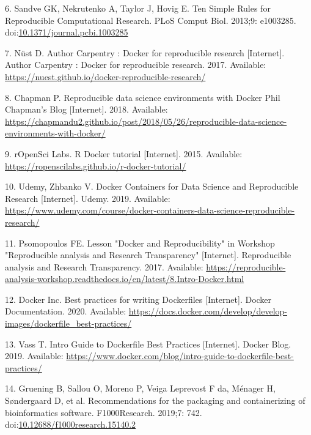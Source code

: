 \documentclass[10pt,letterpaper]{article}
\begin{document}
\leavevmode\hypertarget{ref-sandve_ten_2013}{}%
6. Sandve GK, Nekrutenko A, Taylor J, Hovig E. Ten Simple Rules for
Reproducible Computational Research. PLoS Comput Biol. 2013;9: e1003285.
doi:\href{https://doi.org/10.1371/journal.pcbi.1003285}{10.1371/journal.pcbi.1003285}

\leavevmode\hypertarget{ref-nust_author_2017}{}%
7. Nüst D. Author Carpentry : Docker for reproducible research
{[}Internet{]}. Author Carpentry : Docker for reproducible research.
2017. Available:
\url{https://nuest.github.io/docker-reproducible-research/}

\leavevmode\hypertarget{ref-chapman_reproducible_2018}{}%
8. Chapman P. Reproducible data science environments with Docker Phil
Chapman's Blog {[}Internet{]}. 2018. Available:
\url{https://chapmandu2.github.io/post/2018/05/26/reproducible-data-science-environments-with-docker/}

\leavevmode\hypertarget{ref-ropensci_labs_r_2015}{}%
9. rOpenSci Labs. R Docker tutorial {[}Internet{]}. 2015. Available:
\url{https://ropenscilabs.github.io/r-docker-tutorial/}

\leavevmode\hypertarget{ref-udemy_docker_2019}{}%
10. Udemy, Zhbanko V. Docker Containers for Data Science and
Reproducible Research {[}Internet{]}. Udemy. 2019. Available:
\url{https://www.udemy.com/course/docker-containers-data-science-reproducible-research/}

\leavevmode\hypertarget{ref-psomopoulos_lesson_2017}{}%
11. Psomopoulos FE. Lesson "Docker and Reproducibility" in Workshop
"Reproducible analysis and Research Transparency" {[}Internet{]}.
Reproducible analysis and Research Transparency. 2017. Available:
\url{https://reproducible-analysis-workshop.readthedocs.io/en/latest/8.Intro-Docker.html}

\leavevmode\hypertarget{ref-docker_inc_best_2020}{}%
12. Docker Inc. Best practices for writing Dockerfiles {[}Internet{]}.
Docker Documentation. 2020. Available:
\url{https://docs.docker.com/develop/develop-images/dockerfile_best-practices/}

\leavevmode\hypertarget{ref-vass_intro_2019}{}%
13. Vass T. Intro Guide to Dockerfile Best Practices {[}Internet{]}.
Docker Blog. 2019. Available:
\url{https://www.docker.com/blog/intro-guide-to-dockerfile-best-practices/}

\leavevmode\hypertarget{ref-gruening_recommendations_2019}{}%
14. Gruening B, Sallou O, Moreno P, Veiga Leprevost F da, Ménager H,
Søndergaard D, et al. Recommendations for the packaging and
containerizing of bioinformatics software. F1000Research. 2019;7: 742.
doi:\href{https://doi.org/10.12688/f1000research.15140.2}{10.12688/f1000research.15140.2}
\end{document}
